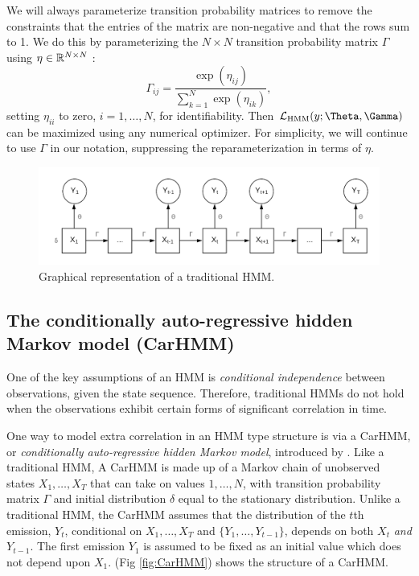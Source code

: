 We will always parameterize transition probability matrices to remove the constraints that the entries of the matrix are non-negative and that the rows sum to 1.  We do this by parameterizing the $N \times N$ transition probability matrix $\Gamma$ using $\eta \in \mathbb{R}^{N \times N}$ \citep{Barajas:2017}:
%
\[
\Gamma_{ij} = \frac{\exp(\eta_{ij})}{\sum_{k=1}^N \exp(\eta_{ik})}, 
\]
%
setting $\eta_{ii}$  to zero, $i=1,\ldots, N$, for identifiability.  Then $\calL_{\text{HMM}}(y;\Theta,\Gamma)$ can be maximized using any numerical optimizer.  For simplicity, we will continue to use $\Gamma$ in our notation, suppressing the reparameterization in terms of  $\eta$.

\begin{figure}[ht]
	\centering
	\includegraphics[width=5in]{../Plots/HMM.png}
	\caption{Graphical representation of a traditional HMM.}
	\label{fig:HMM}
\end{figure}


\subsection{The conditionally auto-regressive hidden Markov model (CarHMM)}

One of the key assumptions of an HMM is \textit{conditional independence} between observations, given the state sequence.  Therefore, traditional HMMs do not hold when the observations exhibit certain forms of significant correlation in time.

One way to model extra correlation in an HMM type structure is via a CarHMM, or \textit{conditionally auto-regressive hidden Markov model}, introduced by \citep{Lawler:2019}. Like a traditional HMM, A CarHMM is made up of a Markov chain of unobserved states $X_1,\ldots, X_T$ that can take on values $1, \ldots, N$, with transition probability matrix $\Gamma$ and initial distribution $\delta$ equal to the stationary distribution. Unlike a traditional HMM, the CarHMM assumes that the distribution of the $t$th emission, $Y_t$, conditional on $X_1,\ldots, X_T$ and $ \{Y_1,\ldots, Y_{t-1}\}$, depends on both $X_t$ \textit{and} $Y_{t-1}$. 
The first emission $Y_1$ is assumed to be fixed as an initial value which does not depend upon $X_1$. (Fig \ref{fig:CarHMM}) shows the structure of a CarHMM.

